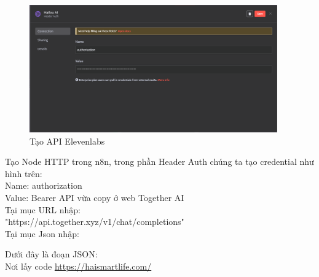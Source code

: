 \begin{itemize}[label=]
\begin{figure}[H]
    \end{figure}
    \begin{figure}[H]
    \centering
    \includegraphics[width=0.95\textwidth]{images/HailuoAI-2.png}
    \caption{Tạo API Elevenlabs}
    
    \end{figure}
    
 Tạo Node HTTP trong n8n, trong phần Header Auth chúng ta tạo credential như hình trên:\\
 Name: authorization\\
 Value: Bearer API vừa copy ở web Together AI\\
 

Tại mục URL nhập: \\
"https://api.together.xyz/v1/chat/completions"\\

Tại mục Json nhập: 


Dưới đây là đoạn JSON:\\

Nơi lấy code \url{https://haismartlife.com/}


\end{itemize}


